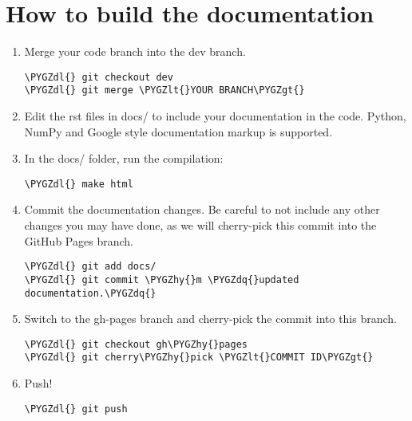 \documentclass[letterpaper,10pt,english]{sphinxmanual}
\def\PYGZlt{\char`\<}
\def\PYGZgt{\char`\>}
\def\PYGZdl{\char`\$}
\def\PYGZhy{\char`\-}
\def\PYGZdq{\char`\"}
\begin{document}
\chapter{How to build the documentation}
\label{index:how-to-build-the-documentation}\begin{enumerate}
\item {} 
Merge your code branch into the dev branch.

\begin{Verbatim}[commandchars=\\\{\}]
\PYGZdl{} git checkout dev
\PYGZdl{} git merge \PYGZlt{}YOUR BRANCH\PYGZgt{}
\end{Verbatim}

\item {} 
Edit the rst files in docs/ to include your documentation in the code. Python, NumPy and Google style documentation markup is supported.

\item {} 
In the docs/ folder, run the compilation:

\begin{Verbatim}[commandchars=\\\{\}]
\PYGZdl{} make html
\end{Verbatim}

\item {} 
Commit the documentation changes. Be careful to not include any other changes you may have done, as we will cherry-pick this commit into the GitHub Pages branch.

\begin{Verbatim}[commandchars=\\\{\}]
\PYGZdl{} git add docs/
\PYGZdl{} git commit \PYGZhy{}m \PYGZdq{}updated documentation.\PYGZdq{}
\end{Verbatim}

\item {} 
Switch to the gh-pages branch and cherry-pick the commit into this branch.

\begin{Verbatim}[commandchars=\\\{\}]
\PYGZdl{} git checkout gh\PYGZhy{}pages
\PYGZdl{} git cherry\PYGZhy{}pick \PYGZlt{}COMMIT ID\PYGZgt{}
\end{Verbatim}

\item {} 
Push!

\begin{Verbatim}[commandchars=\\\{\}]
\PYGZdl{} git push
\end{Verbatim}

\end{enumerate}
\end{document}
